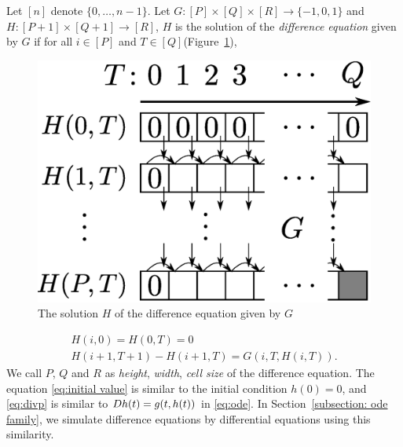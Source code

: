 Let $[n]$ denote $\{0, \dots , n-1\}$.
Let $G \colon [P] \times [Q] \times [R] \to \{-1, 0, 1\}$ and
$H \colon [P + 1] \times [Q+1] \to [R]$,
$H$ is the solution of the \emph{difference equation} given by $G$
if for all $i \in [P]$ and $T \in [Q]$(Figure~\ref{fig:divp}), 
\begin{figure}
 \begin{center}
  \includegraphics[height=0.15\textheight]{image/divp.eps}
 \end{center}
 \caption{The solution $H$ of the difference equation given by $G$}
 \label{fig:divp}
\end{figure}
\begin{gather}
   H(i, 0) = H(0, T) = 0 \label{eq:initial value}
\\
   H(i + 1, T + 1) - H(i+1, T) = G(i, T, H(i, T)).  \label{eq:divp}
\end{gather}
We call $P$, $Q$ and $R$ as \emph{height}, \emph{width}, \emph{cell size} of
the difference equation.
The equation \eqref{eq:initial value} is similar to 
the initial condition $h(0) = 0$,
and \eqref{eq:divp} is similar to $D h(t) = g(t, h(t))$
in \eqref{eq:ode}.
In Section~\ref{subsection: ode family}, we simulate difference equations by differential equations using this similarity.

